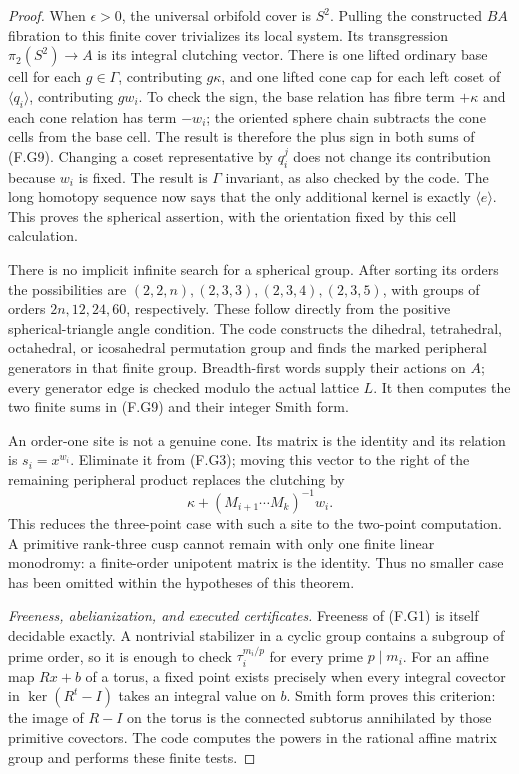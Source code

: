 \begin{proof}
When $\epsilon>0$, the universal orbifold cover is $S^2$.
Pulling the constructed $BA$ fibration to this finite cover
trivializes its local system.  Its transgression
$\pi_2(S^2)\to A$ is its integral clutching vector.
There is one lifted ordinary base cell for each $g\in\Gamma$,
contributing $g\kappa$, and one lifted cone cap for each left
coset of $\langle q_i\rangle$, contributing $gw_i$.
To check the sign, the base relation has fibre term $+\kappa$
and each cone relation has term $-w_i$; the oriented sphere
chain subtracts the cone cells from the base cell.  The result
is therefore the plus sign in both sums of (F.G9).
Changing a coset representative by $q_i^j$ does not change
its contribution because $w_i$ is fixed.  The result is
$\Gamma$ invariant, as also checked by the code.  The long
homotopy sequence now says that the only additional kernel
is exactly $\langle e\rangle$.  This proves the spherical
assertion, with the orientation fixed by this cell calculation.

There is no implicit infinite search for a spherical group.
After sorting its orders the possibilities are
$(2,2,n),(2,3,3),(2,3,4),(2,3,5)$, with groups of orders
$2n,12,24,60$, respectively.  These follow directly from
the positive spherical-triangle angle condition.
The code constructs the dihedral, tetrahedral, octahedral,
or icosahedral permutation group and finds the marked
peripheral generators in that finite group.  Breadth-first
words supply their actions on $A$; every generator edge is
checked modulo the actual lattice $L$.  It then computes
the two finite sums in (F.G9) and their integer Smith form.

An order-one site is not a genuine cone.  Its matrix is the
identity and its relation is $s_i=x^{w_i}$.  Eliminate it
from (F.G3); moving this vector to the right of the remaining
peripheral product replaces the clutching by
\[
       \kappa+(M_{i+1}\cdots M_k)^{-1}w_i.                 \tag{F.G11}
\]
This reduces the three-point case with such a site to the
two-point computation.  A primitive rank-three cusp cannot
remain with only one finite linear monodromy: a finite-order
unipotent matrix is the identity.  Thus no smaller case has
been omitted within the hypotheses of this theorem.

\emph{Freeness, abelianization, and executed certificates.}
Freeness of (F.G1) is itself decidable exactly.  A nontrivial
stabilizer in a cyclic group contains a subgroup of prime
order, so it is enough to check $\tau_i^{m_i/p}$ for every
prime $p\mid m_i$.  For an affine map $Rx+b$ of a torus,
a fixed point exists precisely when every integral covector
in $\ker(R^t-I)$ takes an integral value on $b$.
Smith form proves this criterion: the image of $R-I$ on
the torus is the connected subtorus annihilated by those
primitive covectors.  The code computes the powers in the
rational affine matrix group and performs these finite tests.


\end{proof}
